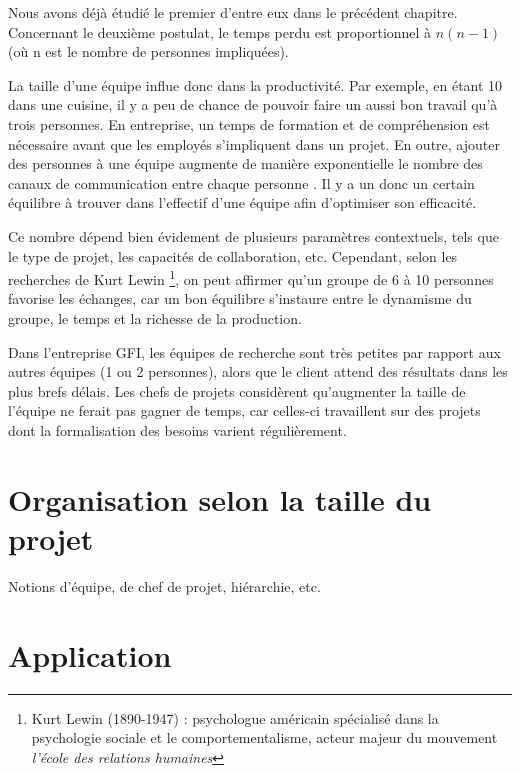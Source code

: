 Nous avons déjà étudié le premier d'entre eux dans le précédent chapitre. Concernant le deuxième postulat, le temps perdu est proportionnel à $ n(n-1) $ (où n est le nombre de personnes impliquées).

La taille d'une équipe influe donc dans la productivité. Par exemple, en étant 10 dans une cuisine, il y a peu de chance de pouvoir faire un aussi bon travail qu'à trois personnes. En entreprise, un temps de formation et de compréhension est nécessaire avant que les employés s'impliquent dans un projet. En outre, ajouter des personnes à une équipe augmente de manière exponentielle le nombre des canaux de communication entre chaque personne . Il y a un donc un certain équilibre à trouver dans l'effectif d'une équipe afin d'optimiser son efficacité.

Ce nombre dépend bien évidement de plusieurs paramètres contextuels, tels que le type de projet, les capacités de collaboration, etc. Cependant, selon les recherches de Kurt Lewin \footnote{Kurt Lewin (1890-1947) : psychologue américain spécialisé dans la psychologie sociale et le comportementalisme, acteur majeur du mouvement \textit{l'école des relations humaines}}, on peut affirmer qu'un groupe de 6 à 10 personnes favorise les échanges, car un bon équilibre s'instaure entre le dynamisme du groupe, le temps et la richesse de la production.


\begin{app}
Dans l'entreprise GFI, les équipes de recherche sont très petites par rapport aux autres équipes (1 ou 2 personnes), alors que le client attend des résultats dans les plus brefs délais. Les chefs de projets considèrent qu'augmenter la taille de l'équipe ne ferait pas gagner de temps, car celles-ci travaillent sur des projets dont la formalisation des besoins varient régulièrement.
\end{app}

\section{Organisation selon la taille du projet}

Notions d'équipe, de chef de projet, hiérarchie, etc.

\section{Application}

